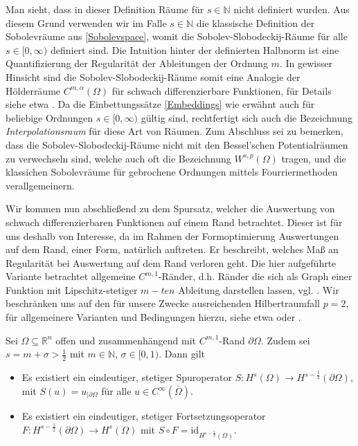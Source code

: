 Man sieht, dass in dieser Definition Räume für $s\in\mathbb{N}$ nicht definiert wurden. Aus diesem Grund verwenden wir im Falle $s\in\mathbb{N}$ die klassische Definition der Sobolevräume aus \ref{Sobolevspace}, womit die Sobolev-Slobodeckij-Räume für alle $s\in[0,\infty)$
definiert sind. Die Intuition hinter der definierten Halbnorm ist eine Quantifizierung der Regularität der Ableitungen der Ordnung $m$. In gewisser Hinsicht sind die Sobolev-Slobodeckij-Räume somit eine Analogie der Hölderräume $C^{m, \alpha}(\Omega)$ für schwach differenzierbare Funktionen, für Details siehe etwa \cite{brokenSobolev}. Da die Einbettungssätze \ref{Embeddings} wie erwähnt auch für beliebige Ordnungen $s\in[0,\infty)$ gültig sind, rechtfertigt sich auch die Bezeichnung \textit{Interpolationsraum} für diese Art von Räumen. Zum Abschluss sei zu bemerken, dass die Sobolev-Slobodeckij-Räume nicht mit den Bessel'schen Potentialräumen zu verwechseln sind, welche auch oft die Bezeichnung $W^{s,p}(\Omega)$ tragen, und die klassichen Sobolevräume für gebrochene Ordnungen mittels Fourriermethoden verallgemeinern.

Wir kommen nun abschließend zu dem Spursatz, welcher die Auswertung von schwach differenzierbaren Funktionen auf einem Rand betrachtet. Dieser ist für uns deshalb von Interesse, da im Rahmen der Formoptimierung Auswertungen auf dem Rand, einer Form, natürlich auftreten. Er beschreibt, welches Maß an Regularität bei Auswertung auf dem Rand verloren geht. Die hier aufgeführte Variante betrachtet allgemeine $C^{m,1}$-Ränder, d.h. Ränder die sich als Graph einer Funktion mit Lipschitz-stetiger $m-ten$ Ableitung darstellen lassen, vgl. \cite{brokenSobolev}. Wir beschränken uns auf den für unsere Zwecke ausreichenden Hilbertraumfall $p=2$, für allgemeinere Varianten und Bedingungen hierzu, siehe etwa \cite{tracetheorem} oder \cite{brokenSobolev}.


\begin{theorem}[Spursatz]
	Sei $\Omega \subseteq \mathbb{R}^n$ offen und zusammenhängend mit $C^{m,1}$-Rand $\partial\Omega$.
	Zudem sei $s = m + \sigma > \frac{1}{2}$ mit $m\in\mathbb{N}$, $\sigma\in[0,1)$. Dann gilt
	\begin{itemize}
		\item[(i)]	Es existiert ein eindeutiger, stetiger Spuroperator $S: H^{s}(\Omega) \rightarrow H^{s-\frac{1}{2}}(\partial\Omega)$, mit $S(u) = u_{\vert \partial \Omega}$ für alle $u\in C^\infty(\bar{\Omega})$.
		\item[(ii)] Es existiert ein eindeutiger, stetiger Fortsetzungsoperator \newline $F: H^{s-\frac{1}{2}}(\partial\Omega) \rightarrow  H^{s}(\Omega)$ mit $S\circ F = \text{id}_{H^{s-\frac{1}{2}}(\Omega)}$.
	\end{itemize}
\end{theorem}

